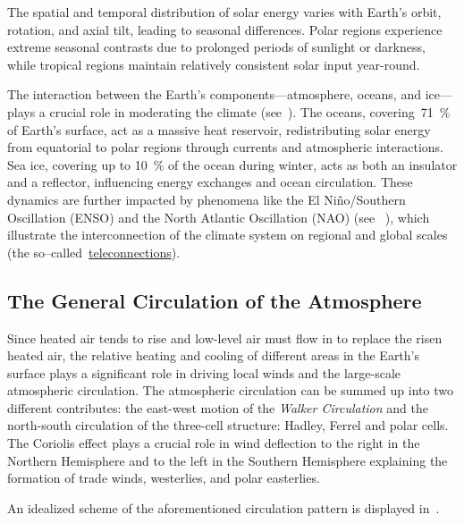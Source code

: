 The spatial and temporal distribution of solar energy varies with Earth’s orbit, rotation, and axial tilt, leading to seasonal differences.
Polar regions experience extreme seasonal contrasts due to prolonged periods of sunlight or darkness, while tropical regions
maintain relatively consistent solar input year-round.


The interaction between the Earth’s components—atmosphere, oceans, and ice—plays a crucial role in moderating the climate
(see~\secref{\ref{sec:atm-ocean-ice-interconnections}}).
The oceans, covering~\qty{71}{\percent} of Earth’s surface, act as a massive heat reservoir,
redistributing solar energy from equatorial to polar regions through currents and atmospheric interactions.
Sea ice, covering up to \qty{10}{\percent} of the ocean during winter, acts as both an insulator and a reflector,
influencing energy exchanges and ocean circulation.
These dynamics are further impacted by phenomena like the El Niño/Southern Oscillation (ENSO) and the North Atlantic Oscillation (NAO) (see ~\secref{\ref{subsec:ocean-interconnections}}),
which illustrate the interconnection of the climate system on regional and global scales
(the so--called~\href{http://www.climate.gov/news-features/blogs/enso/what-are-teleconnections-connecting-earths-climate-patterns-global#:~:text=Teleconnections%20are%20significant%20relationships%20or,that%20span%20thousands%20of%20miles.}{teleconnections}).

\subsection{The General Circulation of the Atmosphere}
\label{subsec:atm-general-circulation}

Since heated air tends to rise and low-level air must flow in to replace the risen heated air, the relative heating and cooling of different areas in the Earth’s surface plays a significant role in driving local winds and the large-scale atmospheric circulation.
The atmospheric circulation can be summed up into two different contributes: the east-west motion of the \textit{Walker Circulation} and the north-south circulation of the
three-cell structure: Hadley, Ferrel and polar cells. The Coriolis effect plays a crucial role in wind deflection to the right in the Northern Hemisphere and to the left in the Southern Hemisphere explaining the formation of trade winds, westerlies, and polar easterlies.

An idealized scheme of the aforementioned circulation pattern is displayed in~\fig{\ref{fig:atm-general-circulation}}.


